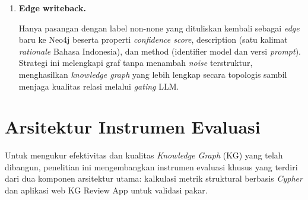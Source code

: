 \documentclass[main]{subfiles}
\begin{document}
\begin{enumerate}
  \item \textbf{Edge writeback.}

  Hanya pasangan dengan label non-none yang dituliskan kembali sebagai \textit{edge}
  baru ke Neo4j beserta properti \textit{confidence score}, description (satu kalimat
  \textit{rationale} Bahasa Indonesia), dan method (identifier model dan versi
  \textit{prompt}). Strategi ini melengkapi graf tanpa menambah \textit{noise} terstruktur,
  menghasilkan \textit{knowledge graph} yang lebih lengkap secara topologis sambil
  menjaga kualitas relasi melalui \textit{gating} LLM.
\end{enumerate}

\section{Arsitektur Instrumen Evaluasi}\label{sec:instrumen-evaluasi}

Untuk mengukur efektivitas dan kualitas \textit{Knowledge Graph} (KG) yang telah
dibangun, penelitian ini mengembangkan instrumen evaluasi khusus yang
terdiri dari dua komponen arsitektur utama: kalkulasi metrik struktural
berbasis \textit{Cypher} dan aplikasi web KG Review App untuk validasi pakar.
\end{document}
